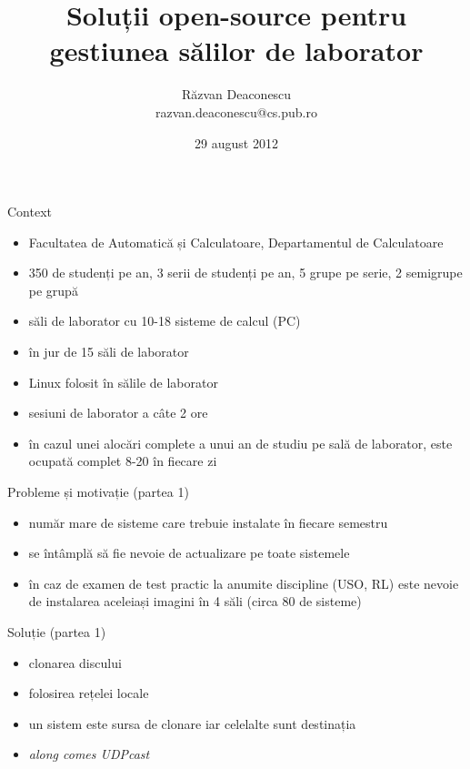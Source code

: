 \documentclass{simple}
\title[Gestiunea laboratorului]{Soluții open-source pentru gestiunea sălilor
de laborator}
\institute{Informatica la Castel (Macea, Arad)}
\author[Răzvan Deaconescu]{Răzvan Deaconescu \\
razvan.deaconescu@cs.pub.ro}
\date{29 august 2012}
\begin{document}
\frame{\titlepage}

\begin{frame}{Context}
  \begin{itemize}
    \item Facultatea de Automatică și Calculatoare, Departamentul de
      Calculatoare
    \item 350 de studenți pe an, 3 serii de studenți pe an, 5 grupe pe serie,
      2 semigrupe pe grupă
    \item săli de laborator cu 10-18 sisteme de calcul (PC)
    \item în jur de 15 săli de laborator
    \item Linux folosit în sălile de laborator
    \item sesiuni de laborator a câte 2 ore
    \item în cazul unei alocări complete a unui an de studiu pe sală de
      laborator, este ocupată complet 8-20 în fiecare zi
  \end{itemize}
\end{frame}

\begin{frame}{Probleme și motivație (partea 1)}
  \begin{itemize}
    \item număr mare de sisteme care trebuie instalate în fiecare semestru
    \item se întâmplă să fie nevoie de actualizare pe toate sistemele
    \item în caz de examen de test practic la anumite discipline (USO, RL)
      este nevoie de instalarea aceleiași imagini în 4 săli (circa 80 de
      sisteme)
  \end{itemize}
\end{frame}

\begin{frame}{Soluție (partea 1)}
  \begin{itemize}
    \item clonarea discului
    \item folosirea rețelei locale
    \item un sistem este sursa de clonare iar celelalte sunt destinația
    \item \textit{along comes UDPcast}
  \end{itemize}
\end{frame}
\end{document}
